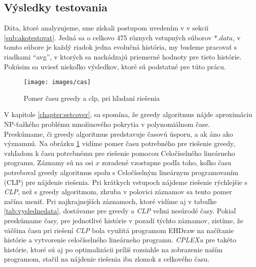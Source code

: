 \subsection{Výsledky testovania}
Dáta, ktoré analyzujeme, sme získali postupom uvedením v v sekcii \ref{sub:akotestovat}.
Jedná sa o celkovo 475 rôznych vstupných súborov $*.data$, v tomto súbore je každý riadok jedna evolučná história, my budeme pracovať s riadkami ``avg'', 
v ktorých sa nachádzajú priemerné hodnoty pre tieto histórie.
Pokúsim sa uviesť niekoľko výsledkov, ktoré sú podstatné pre túto prácu.

\begin{figure}[h]
 \centering
\texttt{[image: images/cas]}
\caption{Pomer času greedy a clp, pri hľadaní riešenia}\label{obr:cas}
\end{figure}


V kapitole \ref{chapter:setcover}, sa spomína, že greedy algoritmus nájde aproximáciu NP-ťažkého problému množinového pokrytia v polynomiálnom čase.
Preskúmame, či greedy algoritmus predstavuje časovú úsporu, a ak áno ako významnú.
Na obrázku \ref{obr:cas} vidíme pomer času potrebného pre riešenie greedy, vzhľadom k času potrebnému pre riešenie pomocou Celočíselného lineárneho programu.
Záznamy sú na osi $x$ zoradené vzostupne podľa toho, koľko času potreboval greedy algoritmus spolu s Celočíselným lineárnym programovaním (CLP) pre nájdenie riešenia.
Pri krátkych vstupoch nájdeme riešenie rýchlejšie s \emph{CLP}, než s greedy algoritmom, zhruba v polovici záznamov sa tento pomer začína meniť. 
Pri najkrajnejších záznamoch, ktoré vidíme aj v tabuľke \ref{tab:vyslednedata}, dostávame pre greedy a \emph{CLP} veľmi nesúrodé časy.
Pokiaľ preskúmame časy, pre jednotlivé histórie v pozadí týchto záznamov, zistíme, že väčšina času pri riešení \emph{CLP} bola využitá programom EHDraw na načítanie histórie a vytvorenie
celočíselného lineárneho programu. \emph{CPLEXu} pre takéto histórie, ktoré sú aj po optimalizácii príliš rozsiahle na zobrazenie naším programom,
stačil na nájdenie riešenia iba zlomok z celkového času.

